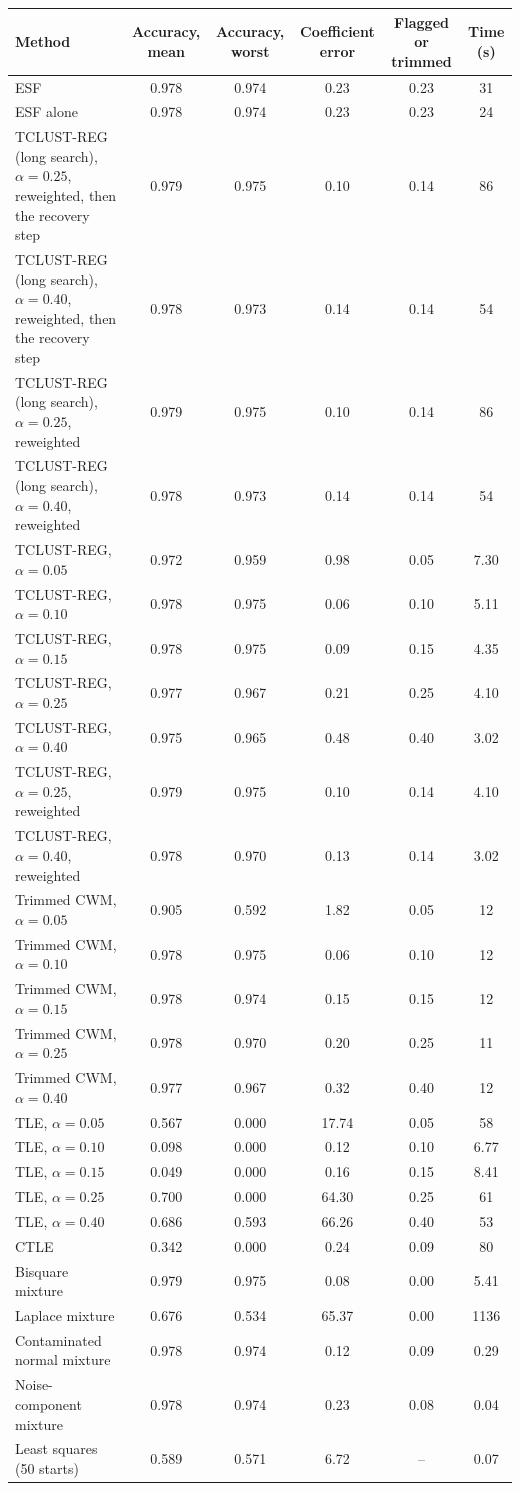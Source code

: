 \begin{tabular}{lccccc}
\toprule
Method & Accuracy, mean & Accuracy, worst & Coefficient error & Flagged or trimmed & Time (s) \\
\midrule
ESF & 0.978 & 0.974 & 0.23 & 0.23 & 31 \\
ESF alone & 0.978 & 0.974 & 0.23 & 0.23 & 24 \\
TCLUST-REG (long search), $\alpha=0.25$, reweighted, then the recovery step & 0.979 & 0.975 & 0.10 & 0.14 & 86 \\
TCLUST-REG (long search), $\alpha=0.40$, reweighted, then the recovery step & 0.978 & 0.973 & 0.14 & 0.14 & 54 \\
TCLUST-REG (long search), $\alpha=0.25$, reweighted & 0.979 & 0.975 & 0.10 & 0.14 & 86 \\
TCLUST-REG (long search), $\alpha=0.40$, reweighted & 0.978 & 0.973 & 0.14 & 0.14 & 54 \\
TCLUST-REG, $\alpha=0.05$ & 0.972 & 0.959 & 0.98 & 0.05 & 7.30 \\
TCLUST-REG, $\alpha=0.10$ & 0.978 & 0.975 & 0.06 & 0.10 & 5.11 \\
TCLUST-REG, $\alpha=0.15$ & 0.978 & 0.975 & 0.09 & 0.15 & 4.35 \\
TCLUST-REG, $\alpha=0.25$ & 0.977 & 0.967 & 0.21 & 0.25 & 4.10 \\
TCLUST-REG, $\alpha=0.40$ & 0.975 & 0.965 & 0.48 & 0.40 & 3.02 \\
TCLUST-REG, $\alpha=0.25$, reweighted & 0.979 & 0.975 & 0.10 & 0.14 & 4.10 \\
TCLUST-REG, $\alpha=0.40$, reweighted & 0.978 & 0.970 & 0.13 & 0.14 & 3.02 \\
Trimmed CWM, $\alpha=0.05$ & 0.905 & 0.592 & 1.82 & 0.05 & 12 \\
Trimmed CWM, $\alpha=0.10$ & 0.978 & 0.975 & 0.06 & 0.10 & 12 \\
Trimmed CWM, $\alpha=0.15$ & 0.978 & 0.974 & 0.15 & 0.15 & 12 \\
Trimmed CWM, $\alpha=0.25$ & 0.978 & 0.970 & 0.20 & 0.25 & 11 \\
Trimmed CWM, $\alpha=0.40$ & 0.977 & 0.967 & 0.32 & 0.40 & 12 \\
TLE, $\alpha=0.05$ & 0.567 & 0.000 & 17.74 & 0.05 & 58 \\
TLE, $\alpha=0.10$ & 0.098 & 0.000 & 0.12 & 0.10 & 6.77 \\
TLE, $\alpha=0.15$ & 0.049 & 0.000 & 0.16 & 0.15 & 8.41 \\
TLE, $\alpha=0.25$ & 0.700 & 0.000 & 64.30 & 0.25 & 61 \\
TLE, $\alpha=0.40$ & 0.686 & 0.593 & 66.26 & 0.40 & 53 \\
CTLE & 0.342 & 0.000 & 0.24 & 0.09 & 80 \\
Bisquare mixture & 0.979 & 0.975 & 0.08 & 0.00 & 5.41 \\
Laplace mixture & 0.676 & 0.534 & 65.37 & 0.00 & 1136 \\
Contaminated normal mixture & 0.978 & 0.974 & 0.12 & 0.09 & 0.29 \\
Noise-component mixture & 0.978 & 0.974 & 0.23 & 0.08 & 0.04 \\
Least squares (50 starts) & 0.589 & 0.571 & 6.72 & -- & 0.07 \\
\bottomrule
\end{tabular}